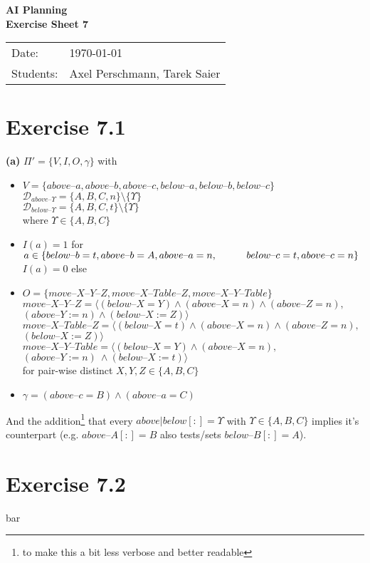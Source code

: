\documentclass[11pt,a4paper]{article}
\newcommand{\sheetNr}{7}
\newcommand{\h}[0]{\text{--}}
\begin{document}
\begin{center}
\Huge{\textbf{AI Planning}}\\
\LARGE{\textbf{Exercise Sheet \sheetNr}}
\end{center}
\vspace{2cm}
\begin{tabular}{ll}
Date: & \today\\
Students: & Axel Perschmann, Tarek Saier
\end{tabular}

\section*{Exercise 7.1}
\textbf{(a)} $\Pi'=\{V,I,O,\gamma\}$ with\\
\begin{itemize}
\item $V=\{above\h a,above\h b,above\h c,below\h a,below\h b,below\h c\}$\\
$\mathscr{D}_{above\h\Upsilon}=\{A,B,C,n\}\setminus\{\Upsilon\}$\\
$\mathscr{D}_{below\h\Upsilon}=\{A,B,C,t\}\setminus\{\Upsilon\}$\\
where $\Upsilon\in\{A,B,C\}$

\item $I(a)=1$ for $a\in \{below\h b=t,above\h b=A,above\h a=n,\\
\hphantom{wwww}below\h c=t,above\h c=n\}$\\
$I(a)=0$ else

\item $O=\{move\h X\h Y\h Z,move\h X\h Table\h Z,move\h X\h Y\h Table\}$\\
$move\h X\h Y\h Z=\langle (below\h X=Y) \land (above\h X=n) \land (above\h Z=n),$\\
\hphantom{wwww}$(above\h Y:=n) \land (below\h X:=Z) \rangle$\\
$move\h X\h Table\h Z=\langle(below\h X=t) \land (above\h X=n) \land (above\h Z=n),$\\
\hphantom{wwww}$(below\h X:=Z)\rangle$\\
$move\h X\h Y\h Table=\langle(below\h X=Y) \land (above\h X=n),$\\
\hphantom{wwww}$(above\h Y:=n)\ \land (below\h X:=t)\rangle$\\
for pair-wise distinct $X,Y,Z\in\{A,B,C\}$

\item $\gamma=(above\h c=B)\land(above\h a=C)$
\end{itemize}
And the addition\footnote{to make this a bit less verbose and better readable} that every $above|below[:]=\Upsilon$ with $\Upsilon\in\{A,B,C\}$ implies it's counterpart (e.g. $above\h A[:]=B$ also tests/sets $below\h B[:]=A$).\\

\section*{Exercise 7.2}
bar

\label{lastpage}
\end{document}
